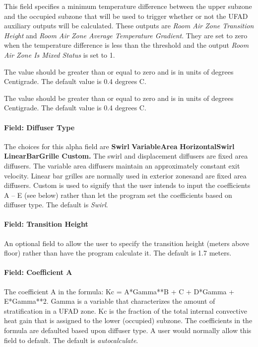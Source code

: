 This field specifies a minimum temperature difference between the upper subzone and the occupied subzone that will be used to trigger whether or not the UFAD auxiliary outputs will be calculated. These outputs are \emph{Room Air Zone Transition Height} and \emph{Room Air Zone Average Temperature Gradient}. They are set to zero when the temperature difference is less than the threshold and the output \emph{Room Air Zone Is Mixed Status} is set to 1.

The value should be greater than or equal to zero and is in units of degrees Centigrade. The default value is 0.4 degrees C.

The value should be greater than or equal to zero and is in units of degrees Centigrade. The default value is 0.4 degrees C.

\paragraph{Field: Diffuser Type}\label{field-diffuser-type-1}

The choices for this alpha field are \textbf{Swirl} \textbar{} \textbf{VariableArea} \textbar{} \textbf{HorizontalSwirl \textbar{} LinearBarGrille \textbar{} Custom.} The swirl and displacement diffusers are fixed area diffusers. The variable area diffusers maintain an approximately constant exit velocity. Linear bar grilles are normally used in exterior zonesand are fixed area diffusers. Custom is used to signify that the user intends to input the coefficients A -- E (see below) rather than let the program set the coefficients based on diffuser type. The default is \emph{Swirl}.

\paragraph{Field: Transition Height}\label{field-transition-height-1}

An optional field to allow the user to specify the transition height (meters above floor) rather than have the program calculate it. The default is 1.7 meters.

\paragraph{Field: Coefficient A}\label{field-coefficient-a-1}

The coefficient A in the formula: Kc = A*Gamma**B + C + D*Gamma + E*Gamma**2. Gamma is a variable that characterizes the amount of stratification in a UFAD zone. Kc is the fraction of the total internal convective heat gain that is assigned to the lower (occupied) subzone. The coefficients in the formula are defaulted based upon diffuser type. A user would normally allow this field to default. The default is \emph{autocalculate}.

